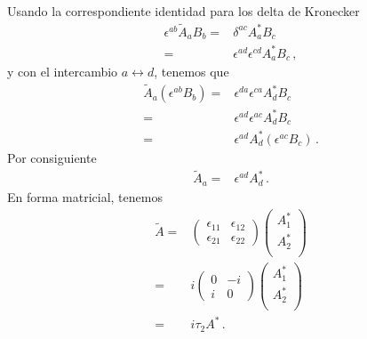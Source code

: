 \begin{frame}
Usando la correspondiente identidad para los delta de Kronecker
\begin{align}
   \epsilon^{ab}\widetilde{A}_{a} B_{b} =&\delta^{ac}A_a^{*}B_c \nonumber\\
                                     =&\epsilon^{ad}\epsilon^{cd}A_a^{*}B_c \,,
 \end{align}
y con el intercambio $a\leftrightarrow d$, tenemos que
\begin{align}
  \widetilde{A}_{a} \left( \epsilon^{ab}B_{b}\right)=&\epsilon^{da}\epsilon^{ca}A_d^{*}B_c \nonumber\\
=&\epsilon^{ad}\epsilon^{ac}A_d^{*}B_c \nonumber\\
=&\epsilon^{ad}A_d^{*}\left( \epsilon^{ac}B_c \right)\,.
\end{align}
Por consiguiente
\begin{align}
\widetilde{A}_a=& \epsilon^{ad}A_d^{*} \,.
\end{align}
En forma matricial, tenemos
\begin{align}
     \widetilde{A}=&\begin{pmatrix} 
                  \epsilon_{11} & \epsilon_{12}\\
                 \epsilon_{21} & \epsilon_{22}
               \end{pmatrix}
               \begin{pmatrix}
                 A_1^{*}\\
                 A_2^{*}\\
               \end{pmatrix}\nonumber\\
               =&i\begin{pmatrix}
                 0 & -i\\
                 i & 0
               \end{pmatrix}
               \begin{pmatrix}
                 A_1^{*}\\
                 A_2^{*}\\
               \end{pmatrix}\nonumber\\
             =&i \tau_2 A^{*}\,.
\end{align}



\end{frame}

